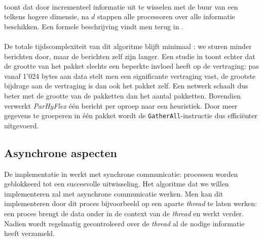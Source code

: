 \paragraph{}
 toont dat door incrementeel informatie uit te wisselen met de buur van een telkens hogere dimensie, na $d$ stappen alle processoren over alle informatie beschikken. Een formele beschrijving vindt men terug in .


\paragraph{}
De totale tijdscomplexiteit van dit algoritme blijft minimaal : we sturen minder berichten door, maar de berichten zelf zijn langer. Een studie in \cite{journals/tjs/TaboadaTD12} toont echter dat de grootte van het pakket slechts een beperkte invloed heeft op de vertraging: pas vanaf 1'024 bytes aan data stelt men een significante vertraging vast, de grootste bijdrage aan de vertraging is dan ook het pakket zelf. Een netwerk schaalt dus beter met de grootte van de pakketten dan het aantal pakketten. Bovendien verwerkt \emph{ParHyFlex} \'e\'en bericht per oproep naar een heuristiek. Door meer gegevens te groeperen in \'e\'en pakket wordt de \texttt{GatherAll}-instructie dus effici\"enter uitgevoerd.

\subsection{Asynchrone aspecten}

De implementatie in  werkt met synchrone communicatie: processen worden geblokkeerd tot een succesvolle uitwisseling. Het algoritme dat we willen implementeren zal met asynchrone communicatie werken. Men kan dit implementeren door dit proces bijvoorbeeld op een aparte \emph{thread} te laten werken: een proces brengt de data onder in de context van de \emph{thread} en werkt verder. Nadien wordt regelmatig gecontroleerd over de \emph{thread} al de nodige informatie heeft verzameld.


